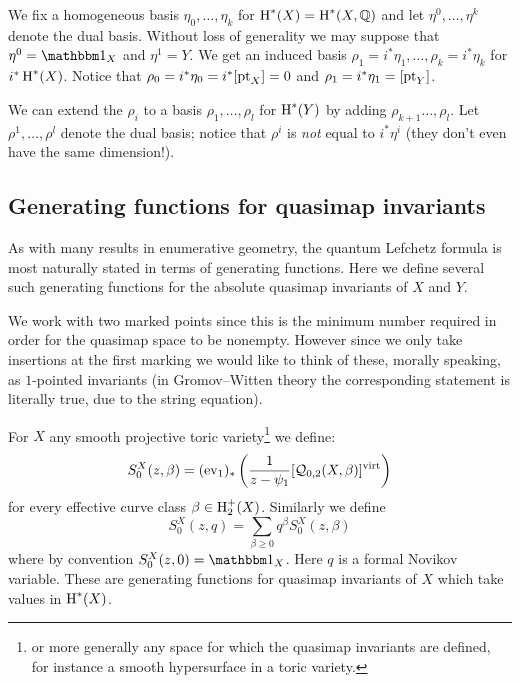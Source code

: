 We fix a homogeneous basis $\eta_0, \ldots, \eta_k$ for $\operatorname{H}^*(X) = \operatorname{H}^*(X,\mathbb{Q})$ and let $\eta^0, \ldots, \eta^k$ denote the dual basis. Without loss of generality we may suppose that $\eta^0=\mathbbm 1_X$ and $\eta^1=Y$. We get an induced basis $\rho_1=i^*\eta_1, \ldots, \rho_k = i^* \eta_k$ for $i^*\operatorname{H}^*(X)$. Notice that $\rho_0 = i^* \eta_0 = i^* [\operatorname{pt}_X] = 0$ and $\rho_1 = i^* \eta_1 = [\operatorname{pt}_Y]$.

We can extend the $\rho_i$ to a basis $\rho_1, \ldots, \rho_l$ for $\operatorname{H}^*(Y)$ by adding $\rho_{k+1}\ldots,\rho_{l}$. Let $\rho^1, \ldots, \rho^l$ denote the dual basis; notice that $\rho^i$ is \emph{not} equal to $i^* \eta^i$ (they don't even have the same dimension!).

\subsection{Generating functions for quasimap invariants}
As with many results in enumerative geometry, the quantum Lefchetz formula is most naturally stated in terms of generating functions. Here we define several such generating functions for the absolute quasimap invariants of $X$ and $Y$.

We work with two marked points since this is the minimum number required in order for the quasimap space to be nonempty. However since we only take insertions at the first marking we would like to think of these, morally speaking, as $1$-pointed invariants (in Gromov--Witten theory the corresponding statement is literally true, due to the string equation).

For $X$ any smooth projective toric variety\footnote{or more generally any space for which the quasimap invariants are defined, for instance a smooth hypersurface in a toric variety.} we define: 
\begin{equation*} S_0^X(z,\beta)=(\operatorname{ev}_1)_*\left(\frac{1}{z-\psi_1} [\mathcal{Q}_{0,2}(X,\beta)]^{\operatorname{virt}}\right) \end{equation*}
for every effective curve class $\beta\in \operatorname{H}_2^+(X)$. Similarly we define
\begin{equation*} S_0^X(z,q)=\sum_{\beta\geq 0} q^\beta S_0^X(z,\beta)\end{equation*}
where by convention $S_0^X(z,0)= \mathbbm 1_X$. Here $q$ is a formal Novikov variable. These are generating functions for quasimap invariants of $X$ which take values in $\operatorname{H}^*(X)$.

